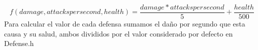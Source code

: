 $$ f(damage,attackspersecond,health) = \frac{damage * attackspersecond}{5} + \frac{health}{500} $$
Para calcular el valor de cada defensa sumamos el daño por segundo que esta causa y su salud, ambos divididos por el valor considerado por defecto en Defense.h
